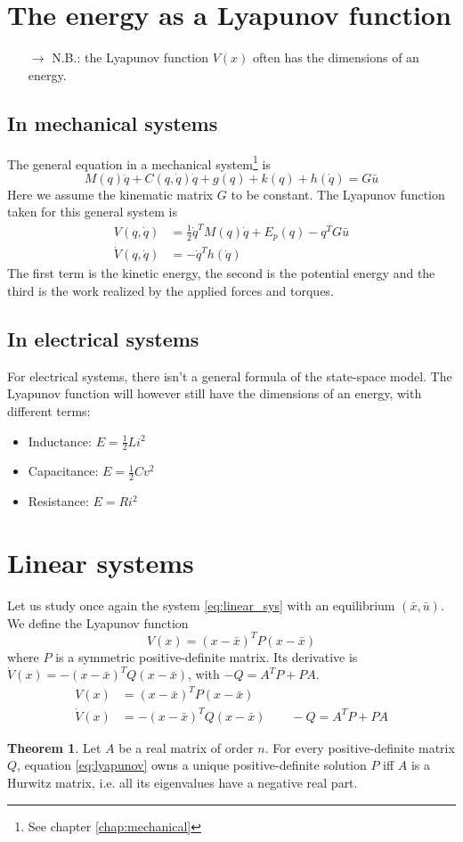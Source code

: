 \documentclass[12pt, openany]{report}
\theoremstyle{definition}
\newtheorem{thm}{Theorem}[chapter]
\begin{document}
\section{The energy as a Lyapunov function}
\begin{itemize}
    \item [\(\rightarrow\)] N.B.: the Lyapunov function \(V(x)\) often has the dimensions of an energy. 
\end{itemize}
\subsection{In mechanical systems}
The general equation in a mechanical system\footnote{See chapter \ref{chap:mechanical}} is 
\begin{equation}
    M(q)\ddot q + C(q,\dot q)\dot q+g(q)+k(q)+h(\dot q)=G\bar u
\end{equation}
Here we assume the kinematic matrix \(G\) to be constant. The Lyapunov function taken for this general system is 
\begin{align}
    V(q,\dot q) &= \frac{1}{2}\dot q^TM(q)\dot q+E_p(q)-q^TG\bar u\\
    \dot V(q,\dot q) &= -\dot q^Th(\dot q)
\end{align}
The first term is the kinetic energy, the second is the potential energy and the third is the work realized by the applied forces and torques.
\subsection{In electrical systems}
For electrical systems, there isn't a general formula of the state-space model. The Lyapunov function will however still have the dimensions of an energy, with different terms:
\begin{itemize}
    \item Inductance: \(E = \frac{1}{2}Li^2\)
    \item Capacitance: \(E = \frac{1}{2}Cv^2\)
    \item Resistance: \(E = Ri^2\)
\end{itemize}
\section{Linear systems}
Let us study once again the system \eqref{eq:linear_sys} with an equilibrium \((\bar x,\bar u)\). We define the Lyapunov function \[V(x) = (x-\bar x)^TP(x-\bar x)\] where \(P\) is a symmetric positive-definite matrix. Its derivative is \(\dot V(x) = -(x-\bar x)^TQ(x-\bar x)\), with \(-Q=A^TP+PA\). 
\begin{align}
    V(x) &= (x-\bar x)^TP(x-\bar x)\\
    \dot V(x) &= -(x-\bar x)^TQ(x-\bar x)\qquad -Q = A^TP+PA \label{eq:lyapunov}
\end{align}
\begin{thm}
    Let \(A\) be a real matrix of order \(n\). For every positive-definite matrix \(Q\), equation \eqref{eq:lyapunov} owns a unique positive-definite solution \(P\) iff \(A\) is a Hurwitz matrix, i.e. all its eigenvalues have a negative real part.
\end{thm}
\end{document}
